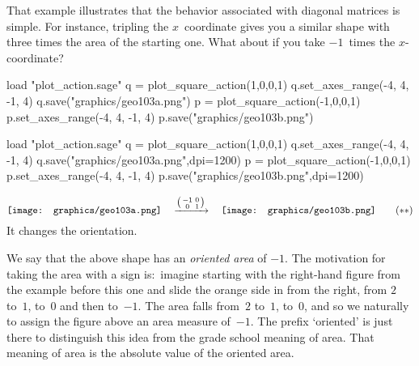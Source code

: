 That example illustrates that the behavior associated with diagonal matrices
is simple.
For instance, tripling the $x$~coordinate gives you a similar shape with
three times the area of the starting one.
What about if you take $-1$~times the $x$-coordinate?
\begin{sageoutput}[d,0,4;d,5,7]
load "plot_action.sage"
q = plot_square_action(1,0,0,1) 
q.set_axes_range(-4, 4, -1, 4) 
q.save("graphics/geo103a.png")
p = plot_square_action(-1,0,0,1) 
p.set_axes_range(-4, 4, -1, 4) 
p.save("graphics/geo103b.png")
\end{sageoutput}
\begin{sagesilent}
load "plot_action.sage"
q = plot_square_action(1,0,0,1) 
q.set_axes_range(-4, 4, -1, 4) 
q.save("graphics/geo103a.png",dpi=1200)
p = plot_square_action(-1,0,0,1) 
p.set_axes_range(-4, 4, -1, 4) 
p.save("graphics/geo103b.png",dpi=1200)
\end{sagesilent}
\begin{equation*}
  \vcenteredhbox{\texttt{[image: graphics/geo103a.png]}}
  \quad\mapsvia{\big (\begin{smallmatrix} -1 &0 \\ 0 &1 \end{smallmatrix}\big )}\quad
  \vcenteredhbox{\texttt{[image: graphics/geo103b.png]}}
  \tag{$**$}
\end{equation*}
\noindent
It changes the orientation.

We say that the above shape has an \textit{oriented area}
of $-1$.
The motivation for taking the area with a sign 
is:~imagine starting with the right-hand figure 
from the example before this one
and slide the orange side in from the right, from $2$ to~$1$, to~$0$ and
then to~$-1$.
The area falls from~$2$ to~$1$, to~$0$, and so we naturally
to assign the figure above an area measure of~$-1$.
The prefix `oriented' is just there to distinguish this idea from the
grade school meaning of
area.
That meaning of area is the absolute value of the oriented area.

